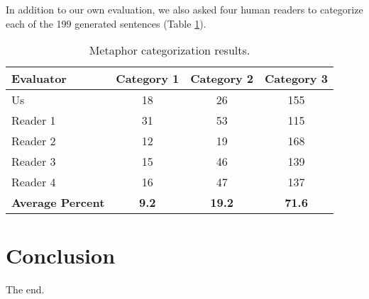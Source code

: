 \documentclass[12pt]{article}
\begin{document}
In addition to our own evaluation, we also asked four human readers to categorize each of the 199 generated sentences (Table \ref{tab:catresults}).

\begin{table}[H]
\centering
\small
\begin{tabular}{|l|c|c|c|} \hline
\textbf{Evaluator} & \textbf{Category 1} & \textbf{Category 2} & \textbf{Category 3} \\ \hline
Us & 18 & 26 & 155\\ \hline
Reader 1 & 31 & 53 & 115\\ \hline
Reader 2 & 12 & 19 & 168\\ \hline
Reader 3 & 15 & 46 & 139\\ \hline
Reader 4 & 16 & 47 & 137\\ \hline
\textbf{Average Percent} & \textbf{9.2} & \textbf{19.2} & \textbf{71.6} \\ \hline
\end{tabular}
\caption{Metaphor categorization results.}
\label{tab:catresults}
\end{table}

\section{Conclusion}
The end.
\end{document}
